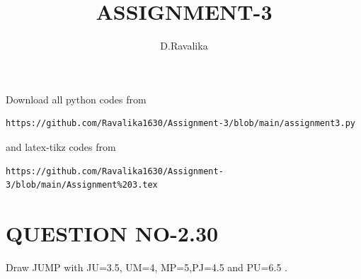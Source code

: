\documentclass[journal,12pt,twocolumn]{IEEEtran}
\begin{document}
     \def\centbox#1{\makebox[0in]{#1}}
     \def\topbox#1{\raisebox{-\baselineskip}[0in][0in]{#1}}
     \def\midbox#1{\raisebox{-0.5\baselineskip}[0in][0in]{#1}}
\vspace{3cm}
\title{ASSIGNMENT-3}
\author{D.Ravalika}
\maketitle
\bigskip
\renewcommand{\thefigure}{\theenumi}
\renewcommand{\thetable}{\theenumi}
Download all python codes from 
\begin{lstlisting}
https://github.com/Ravalika1630/Assignment-3/blob/main/assignment3.py
\end{lstlisting}
%
and latex-tikz codes from 
%
\begin{lstlisting}
https://github.com/Ravalika1630/Assignment-3/blob/main/Assignment%203.tex

\end{lstlisting}
%
\section{QUESTION NO-2.30}

\item Draw JUMP with JU=3.5, UM=4, MP=5,PJ=4.5 and PU=6.5 .
%
\end{document}
